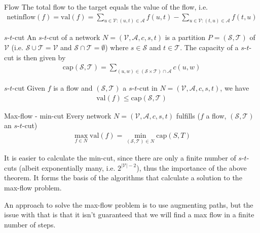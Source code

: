 \begin{lemma}[]{Flow}
    The total flow to the target equals the value of the flow, i.e.
    \begin{align*}
        \text{netinflow}(f) = \text{val}(f) = \sum_{u \in \mathcal{V} : (u, t) \in \mathcal{A}} f(u, t) - \sum_{u \in \mathcal{V}: (t, u) \in \mathcal{A}} f(t, u)
    \end{align*}
\end{lemma}


\begin{definition}[]{$s$-$t$-cut}
    An $s$-$t$-cut of a network $N = (\mathcal{V}, \mathcal{A}, c, s, t)$ is a partition $P = (\mathcal{S}, \mathcal{T})$ of $\mathcal{V}$ (i.e. $\mathcal{S} \cup \mathcal{T} = \mathcal{V}$ and $\mathcal{S} \cap \mathcal{T} = \emptyset$) where $s \in \mathcal{S}$ and $t \in \mathcal{T}$.
    The capacity of a $s$-$t$-cut is then given by
    \begin{align*}
        \text{cap}(\mathcal{S}, \mathcal{T}) = \sum_{(u, w) \in (\mathcal{S} \times \mathcal{T}) \cap \mathcal{A}} c(u, w)
    \end{align*}
\end{definition}

\begin{lemma}[]{$s$-$t$-cut}
    Given $f$ is a flow and $(\mathcal{S}, \mathcal{T})$ a $s$-$t$-cut in $N = (\mathcal{V}, \mathcal{A}, c, s, t)$, we have
    \begin{align*}
        \text{val}(f) \leq \text{cap}(\mathcal{S}, \mathcal{T})
    \end{align*}
\end{lemma}


\begin{theorem}[]{Max-flow - min-cut}
    Every network $N = (\mathcal{V}, \mathcal{A}, c, s, t)$ fulfills ($f$ a flow, $(\mathcal{S}, \mathcal{T})$ an $s$-$t$-cut)
    \begin{align*}
        \max_{f \in N} \text{val}(f) = \min_{(\mathcal{S}, \mathcal{T}) \in N} \text{cap}(S, T)
    \end{align*}
\end{theorem}

It is easier to calculate the min-cut, since there are only a finite number of $s$-$t$-cuts (albeit exponentially many, i.e. $2^{|\mathcal{V}| - 2}$), thus the importance of the above theorem.
It forms the basis of the algorithms that calculate a solution to the max-flow problem.

An approach to solve the max-flow problem is to use augmenting paths, but the issue with that is that it isn't guaranteed that we will find a max flow in a finite number of steps.

